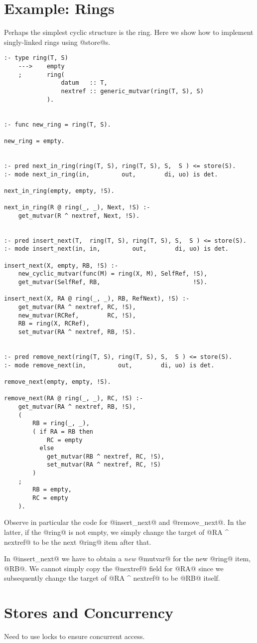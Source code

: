 \section{Example: Rings}

Perhaps the simplest cyclic structure is the ring.  Here we show how to
implement singly-linked rings using @store@s.

\begin{verbatim}
:- type ring(T, S)
    --->    empty
    ;       ring(
                datum   :: T,
                nextref :: generic_mutvar(ring(T, S), S)
            ).


:- func new_ring = ring(T, S).

new_ring = empty.


:- pred next_in_ring(ring(T, S), ring(T, S), S,  S ) <= store(S).
:- mode next_in_ring(in,         out,        di, uo) is det.

next_in_ring(empty, empty, !S).

next_in_ring(R @ ring(_, _), Next, !S) :-
    get_mutvar(R ^ nextref, Next, !S).


:- pred insert_next(T,  ring(T, S), ring(T, S), S,  S ) <= store(S).
:- mode insert_next(in, in,         out,        di, uo) is det.

insert_next(X, empty, RB, !S) :-
    new_cyclic_mutvar(func(M) = ring(X, M), SelfRef, !S),
    get_mutvar(SelfRef, RB,                          !S).

insert_next(X, RA @ ring(_, _), RB, RefNext), !S) :-
    get_mutvar(RA ^ nextref, RC, !S),
    new_mutvar(RCRef,        RC, !S),
    RB = ring(X, RCRef),
    set_mutvar(RA ^ nextref, RB, !S).


:- pred remove_next(ring(T, S), ring(T, S), S,  S ) <= store(S).
:- mode remove_next(in,         out,        di, uo) is det.

remove_next(empty, empty, !S).

remove_next(RA @ ring(_, _), RC, !S) :-
    get_mutvar(RA ^ nextref, RB, !S),
    (
        RB = ring(_, _),
        ( if RA = RB then
            RC = empty
          else
            get_mutvar(RB ^ nextref, RC, !S),
            set_mutvar(RA ^ nextref, RC, !S)
        )
    ;
        RB = empty,
        RC = empty
    ).
\end{verbatim}

Observe in particular the code for @insert_next@ and @remove_next@.  In
the latter, if the @ring@ is not empty, we simply change the target of
@RA ^ nextref@ to be the next @ring@ item after that.

In @insert_next@ we have to obtain a \emph{new} @mutvar@ for the new
@ring@ item, @RB@.  We cannot simply copy the @nextref@ field for @RA@
since we subsequently change the target of @RA ^ nextref@ to be @RB@
itself.  

\section{Stores and Concurrency}

Need to use locks to ensure concurrent access.
